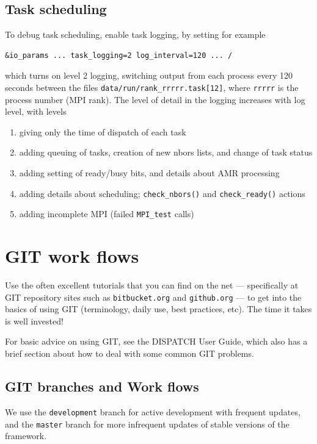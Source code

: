 \documentclass[paper=a4,fontsize=11pt]{scrartcl}
\numberwithin{equation}{section}		%
\numberwithin{figure}{section}			%
\numberwithin{table}{section}				%
\newcommand{\gitcolor}{\color{Brown}}
\newcommand{\codecolor}{\color{Blue}}
\newcommand{\inputcolor}{\color{Blue}}
\newcommand{\urlcolor}{\color{Purple}}
\newcommand{\filecolor}{\color{NavyBlue}}
\newcommand{\Git}[1]{\texttt{\gitcolor #1}}
\newcommand{\File}[1]{{\filecolor\texttt{#1}}}
\newcommand{\Code}[1]{{\codecolor\texttt{#1}}}
\newcommand{\URL}[1]{{\urlcolor\texttt{#1}}}
\def\checkready{\Code{check\_ready()}}
\def\checknbors{\Code{check\_nbors()}}
\begin{document}
\subsection{Task scheduling}
To debug task scheduling, enable task logging, by setting for example
{\inputcolor
\begin{verbatim}
&io_params ... task_logging=2 log_interval=120 ... /
\end{verbatim}
}
which turns on level 2 logging, switching output from each process every 120 seconds between the files \File{data/run/rank\_rrrrr.task[12]}, where \File{rrrrr} is the process number (MPI rank).  The level of detail in the logging increases with log level, with levels
\begin{enumerate}
    \item giving only the time of dispatch of each task
    \item adding queuing of tasks, creation of new nbors lists, and change of task status
    \item adding setting of ready/busy bits, and details about AMR processing
    \item adding details about scheduling; \checknbors{} and \checkready{} actions
    \item adding incomplete MPI (failed \Code{MPI\_test} calls)
\end{enumerate}

\section{GIT work flows}

Use the often excellent tutorials that you can find on the net --- specifically at GIT repository sites such as \URL{bitbucket.org} and \URL{github.org} --- to get into the basics of using GIT (terminology, daily use, best practices, etc).   The time it takes is well invested!

For basic advice on using GIT, see the DISPATCH User Guide, which also has a brief section about how to deal with some common GIT problems.

\subsection{GIT branches and Work flows}
We use the \Git{development} branch for active development with frequent updates, and the \Git{master} branch for more infrequent updates of stable versions of the framework.
\end{document}
